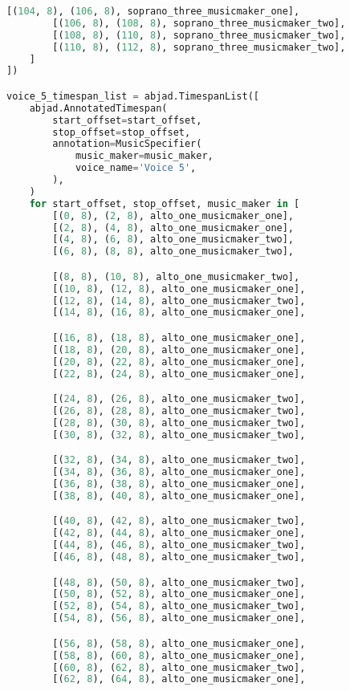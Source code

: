 \begin{lstlisting}[language=Python, caption=Invocation Source Code]
        [(104, 8), (106, 8), soprano_three_musicmaker_one],
        [(106, 8), (108, 8), soprano_three_musicmaker_two],
        [(108, 8), (110, 8), soprano_three_musicmaker_two],
        [(110, 8), (112, 8), soprano_three_musicmaker_two],
    ]
])

voice_5_timespan_list = abjad.TimespanList([
    abjad.AnnotatedTimespan(
        start_offset=start_offset,
        stop_offset=stop_offset,
        annotation=MusicSpecifier(
            music_maker=music_maker,
            voice_name='Voice 5',
        ),
    )
    for start_offset, stop_offset, music_maker in [
        [(0, 8), (2, 8), alto_one_musicmaker_one],
        [(2, 8), (4, 8), alto_one_musicmaker_one],
        [(4, 8), (6, 8), alto_one_musicmaker_two],
        [(6, 8), (8, 8), alto_one_musicmaker_two],

        [(8, 8), (10, 8), alto_one_musicmaker_two],
        [(10, 8), (12, 8), alto_one_musicmaker_one],
        [(12, 8), (14, 8), alto_one_musicmaker_two],
        [(14, 8), (16, 8), alto_one_musicmaker_one],

        [(16, 8), (18, 8), alto_one_musicmaker_one],
        [(18, 8), (20, 8), alto_one_musicmaker_one],
        [(20, 8), (22, 8), alto_one_musicmaker_one],
        [(22, 8), (24, 8), alto_one_musicmaker_one],

        [(24, 8), (26, 8), alto_one_musicmaker_two],
        [(26, 8), (28, 8), alto_one_musicmaker_two],
        [(28, 8), (30, 8), alto_one_musicmaker_two],
        [(30, 8), (32, 8), alto_one_musicmaker_two],

        [(32, 8), (34, 8), alto_one_musicmaker_two],
        [(34, 8), (36, 8), alto_one_musicmaker_one],
        [(36, 8), (38, 8), alto_one_musicmaker_one],
        [(38, 8), (40, 8), alto_one_musicmaker_one],

        [(40, 8), (42, 8), alto_one_musicmaker_two],
        [(42, 8), (44, 8), alto_one_musicmaker_one],
        [(44, 8), (46, 8), alto_one_musicmaker_two],
        [(46, 8), (48, 8), alto_one_musicmaker_two],

        [(48, 8), (50, 8), alto_one_musicmaker_two],
        [(50, 8), (52, 8), alto_one_musicmaker_one],
        [(52, 8), (54, 8), alto_one_musicmaker_two],
        [(54, 8), (56, 8), alto_one_musicmaker_one],

        [(56, 8), (58, 8), alto_one_musicmaker_one],
        [(58, 8), (60, 8), alto_one_musicmaker_one],
        [(60, 8), (62, 8), alto_one_musicmaker_two],
        [(62, 8), (64, 8), alto_one_musicmaker_one],


\end{lstlisting}
